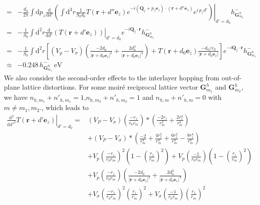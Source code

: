 \documentclass[aps,prx,10pt,twocolumn,superscriptaddress]{revtex4}
\begin{document}
\begin{widetext}
\begin{equation}
\begin{split}
=&-\frac{d_{0}}{2\pi}\int\mathrm{d}p_{z}\left.\frac{\mathrm{d}}{\mathrm{d}d'}\left(\int\mathrm{d}^{3}r\frac{1}{S_{0}d_{0}} T(\textbf{r}+d''\textbf{e}_{z})e^{-i(\textbf{Q}_{j}+p_{z}\textbf{e}_{z})\cdot(\textbf{r}+d''\textbf{e}_{z})}e^{i\,p_{z}d'}\right)\right|_{d'=d_{0}}h^{-}_{\textbf{G}^{h}_{m_{1}}}\\
=&-\frac{1}{S_{0}}\int\mathrm{d}^{2}r\left.\frac{\mathrm{d}}{\mathrm{d}d'}\left(T(\textbf{r}+d'\textbf{e}_{z})\right)\right|_{d'=d_{0}}e^{-i\textbf{Q}_{j}\cdot\textbf{r}}h^{-}_{\textbf{G}^{h}_{m_{1}}}\\
=&-\frac{1}{S_{0}}\int\mathrm{d}^{2}r\left[(V_{p}-V_{\sigma})\left(\frac{-2d_{0}}{\left|\textbf{r}+d_{0}\textbf{e}_{z}\right|^{2}}+\frac{2d^{3}_{0}}{\left|\textbf{r}+d_{0}\textbf{e}_{z}\right|^{4}}\right)+T(\textbf{r}+d_{0}\textbf{e}_{z})\frac{-d_{0}/r_{0}}{\left|\textbf{r}+d_{0}\textbf{e}_{z}\right|}\right]e^{-i\textbf{Q}_{j}\cdot\textbf{r}}h^{-}_{\textbf{G}^{h}_{m_{1}}}\\
\approx&-0.248\,h^{-}_{\textbf{G}^{h}_{m_{1}}}\,\textrm{eV}
\end{split}
\end{equation}
We also consider the second-order effects to the interlayer hopping from out-of-plane lattice distortions. For some moir\'e reciprocal lattice vector $\textbf{G}^{h}_{m_{1}}$ and $\textbf{G}^{h}_{m_{2}}$, we have $n_{h,m_{1}}+n'_{h,m_{1}}\!=\!1$,$n_{h,m_{2}}+n'_{h,m_{2}}\!=\!1$ and $n_{h,m}+n'_{h,m}\!=\!0$ with $m\!\neq\!m_{1}, m_{2}$., which leads to
\begin{equation}
\begin{split}
\left.\frac{\mathrm{d}^{2}}{\mathrm{d}d'^{2}}T(\textbf{r}+d'\textbf{e}_{z})\right|_{d'=d_{0}}=&(V_{P}-V_{\sigma})\left(\frac{-r_{z}}{r_{0}r_{m}}\right)*\left(\frac{-2r_{z}}{r_{m}^{2}}+\frac{2r_{z}^{3}}{r_{m}^{4}}\right)\\
&+(V_{P}-V_{\sigma})*\left(\frac{-2}{r_{m}^{2}}+\frac{4r_{z}^{2}}{r_{m}^{4}}+\frac{6r_{z}^{2}}{r_{m}^{4}}-\frac{8r_{z}^{4}}{r_{m}^{6}}\right)\\
&+V_{p}\left(\frac{-r_{z}}{r_{0}r_{m}}\right)^{2}\left(1-\left(\frac{r_{z}}{r_{m}}\right)^{2}\right)+V_{p}\left(\frac{-1}{r_{0}r_{m}}\right)\left(1-\left(\frac{r_{z}}{r_{m}}\right)^{2}\right)\\
&+V_{p}\left(\frac{-r_{z}}{r_{0}r_{m}}\right)\left(\frac{-2d_{0}}{\left|\textbf{r}+d_{0}\textbf{e}_{z}\right|^{2}}+\frac{2d^{3}_{0}}{\left|\textbf{r}+d_{0}\textbf{e}_{z}\right|^{4}}\right)\\
&+V_{\sigma}\left(\frac{-r_{z}}{r_{0}r_{m}}\right)^{2}\left(\frac{r_{z}}{r_{m}}\right)^{2}+V_{\sigma}\left(\frac{-1}{r_{0}r_{m}}\right)\left(\frac{r_{z}}{r_{m}}\right)^{2}\\

\end{split}
\end{equation}
\end{widetext}
\end{document}
